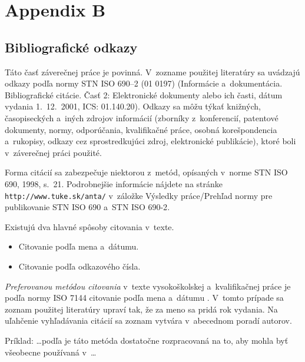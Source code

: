 \section*{Appendix B}
\subsection*{Bibliografick\'e odkazy}

Táto časť\/ záverečnej práce je povinná. V~zozname použitej literatúry
sa uvádzajú odkazy podľa normy STN ISO 690--2 (01 0197) (Informácie
a~dokumentácia. Bibliografické citácie. Časť\/ 2: Elektronické
dokumenty alebo ich časti, dátum vydania 1.~12.~2001, ICS: 01.140.20).
Odkazy sa môžu týkať\/ knižných, časopiseckých a~iných zdrojov
informácií (zborníky z~konferencií, patentové dokumenty, normy,
odporúčania, kvalifikačné práce, osobná korešpondencia a~rukopisy,
odkazy cez sprostredkujúci zdroj, elektronické publikácie), ktoré boli
v~záverečnej práci použité.

Forma citácií sa zabezpečuje niektorou z~metód, opísaných v~norme STN
ISO 690, 1998, s.~21. Podrobnejšie informácie nájdete na stránke
\texttt{http://www.tuke.sk/anta/} v~záložke {\small\sf Výsledky
práce/Prehľad normy pre publikovanie STN ISO 690 a~STN ISO 690-2}.

Existujú dva hlavné spôsoby citovania v~texte.

\begin{itemize}
\item Citovanie podľa mena a~dátumu.
\item Citovanie podľa odkazového čísla.
\end{itemize}

\emph{Preferovanou metódou citovania} v~texte vysokoškolskej
a~kvalifikačnej práce je podľa normy ISO 7144 citovanie podľa mena
a~dátumu \citep{kat,gonda}. V~tomto prípade sa zoznam použitej
literatúry upraví tak, že za meno sa pridá rok vydania. Na uľahčenie
vyhľadávania citácií sa zoznam vytvára v~abecednom poradí autorov.

\medskip

Príklad:
\dots podľa \citep{steinerova} je táto metóda dostatočne rozpracovaná
na to, aby mohla byť\/ všeobecne používaná v~\dots

\medskip

